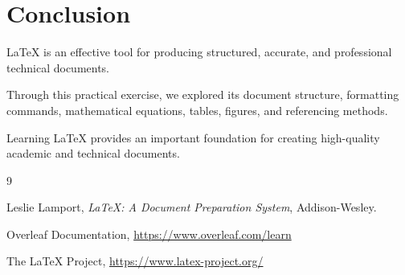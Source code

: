 \documentclass[12pt,a4paper]{article}
\begin{document}
\section{Conclusion}

LaTeX is an effective tool for producing structured,
accurate, and professional technical documents.

Through this practical exercise, we explored its
document structure, formatting commands, mathematical
equations, tables, figures, and referencing methods.

Learning LaTeX provides an important foundation for
creating high-quality academic and technical documents.

\begin{thebibliography}{9}

Leslie Lamport,
\textit{LaTeX: A Document Preparation System},
Addison-Wesley.

Overleaf Documentation,
\url{https://www.overleaf.com/learn}

The LaTeX Project,
\url{https://www.latex-project.org/}

\end{thebibliography}
\end{document}
